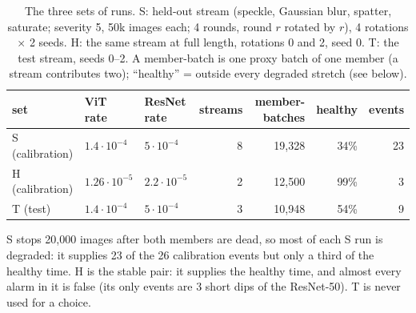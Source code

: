 \documentclass[10pt]{article}
\newcommand{\rn}{ResNet-50}
\begin{document}
\begin{table}[ht]
  \centering\small
  \caption{The three sets of runs. S: held-out stream (speckle, Gaussian blur, spatter, saturate; severity 5, 50k images each; 4 rounds, round $r$ rotated by $r$), 4 rotations $\times$ 2 seeds. H: the same stream at full length, rotations 0 and 2, seed 0. T: the test stream, seeds 0--2. A member-batch is one proxy batch of one member (a stream contributes two); ``healthy'' = outside every degraded stretch (see below).}
  \label{tab:data}
  \begin{tabular}{@{}l l l r r r r@{}}
    \toprule
    set & ViT rate & ResNet rate & streams & member-batches & healthy & events \\
    \midrule
    S (calibration) & $1.4{\cdot}10^{-4}$  & $5{\cdot}10^{-4}$   & 8 & 19,328 & 34\% & 23 \\
    H (calibration) & $1.26{\cdot}10^{-5}$ & $2.2{\cdot}10^{-5}$ & 2 & 12,500 & 99\% & 3 \\
    T (test)        & $1.4{\cdot}10^{-4}$  & $5{\cdot}10^{-4}$   & 3 & 10,948 & 54\% & 9 \\
    \bottomrule
  \end{tabular}
\end{table}
\noindent S stops 20,000 images after both members are dead, so most of each S run is degraded: it supplies 23 of the 26 calibration events but only a third of the healthy time. H is the stable pair: it supplies the healthy time, and almost every alarm in it is false (its only events are 3 short dips of the \rn{}). T is never used for a choice.
\end{document}
